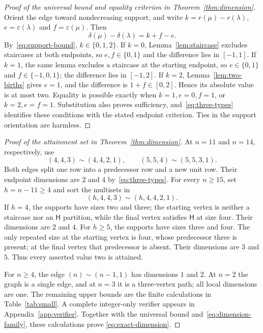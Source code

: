 \documentclass[11pt]{article}
\newcommand{\HH}{\mathsf{H}}
\begin{document}
\begin{proof}[Proof of the universal bound and equality criterion in
Theorem~\ref{thm:dimension}]
Orient the edge toward nondecreasing support, and write
$k=r(\mu)-r(\lambda)$, $e=\varepsilon(\lambda)$ and
$f=\varepsilon(\mu)$. Then
\begin{equation}\label{eq:signed-jump}
 \delta(\mu)-\delta(\lambda)=k+f-e.
\end{equation}
By~\eqref{eq:support-bound}, $k\in\{0,1,2\}$.
If $k=0$, Lemma~\ref{lem:staircase} excludes staircases at both endpoints,
so $e,f\in\{0,1\}$ and the difference lies in $[-1,1]$.
If $k=1$, the same lemma excludes a staircase at the starting endpoint,
so $e\in\{0,1\}$ and $f\in\{-1,0,1\}$; the difference lies in $[-1,2]$.
If $k=2$, Lemma~\ref{lem:two-births} gives $e=1$, and the difference
is $1+f\in[0,2]$.
Hence its absolute value is at most two. Equality is possible exactly
when $k=1,e=0,f=1$, or $k=2,e=f=1$. Substitution also proves sufficiency,
and~\eqref{eq:three-types} identifies these conditions with the stated
endpoint criterion. Ties in the support orientation are harmless.
\end{proof}

\begin{proof}[Proof of the attainment set in Theorem~\ref{thm:dimension}]
At $n=11$ and $n=14$, respectively, use
\[
 (4,4,3)\sim(4,4,2,1),\qquad
 (5,5,4)\sim(5,5,3,1).
\]
Both edges split one row into a predecessor row and a new unit row.
Their endpoint dimensions are $2$ and $4$ by~\eqref{eq:three-types}.
For every $n\geq15$, set $h=n-11\geq4$ and sort the multisets in
\begin{equation}\label{eq:dimension-family}
 (h,4,4,3)\sim(h,4,4,2,1).
\end{equation}
If $h=4$, the supports have sizes two and three; the starting vertex
is neither a staircase nor an $\HH$ partition, while the final vertex
satisfies $\HH$ at size four. Their dimensions are $2$ and $4$.
For $h\geq5$, the supports have sizes three and four. The only repeated
size at the starting vertex is four, whose predecessor three is present;
at the final vertex that predecessor is absent. Their dimensions are
$3$ and $5$. Thus every asserted value two is attained.

For $n\geq4$, the edge $(n)\sim(n-1,1)$ has dimensions $1$ and $2$.
At $n=2$ the graph is a single edge, and at $n=3$ it is a three-vertex
path; all local dimensions are one. The remaining upper bounds are the
finite calculations in Table~\ref{tab:small}. A complete integer-only
verifier appears in Appendix~\ref{app:verifier}. Together with the
universal bound and~\eqref{eq:dimension-family}, these calculations prove
\eqref{eq:exact-dimension}.
\end{proof}
\end{document}
